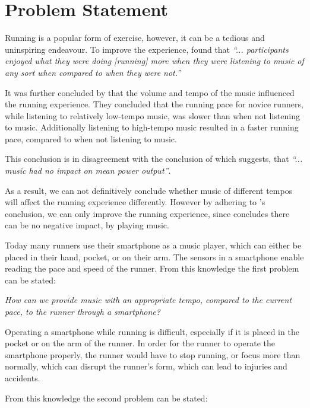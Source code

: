 \section{Problem Statement}
Running is a popular form of exercise, however, it can be a tedious and uninspiring endeavour.
To improve the experience, \citet{musicRunEffectArticle} found that 
\textit{``... participants enjoyed what they were doing [running] more when they were listening to music of any sort when compared to when they were not.''}

It was further concluded by \citet{musicRunEffectArticle} that the volume and tempo of the music influenced the running experience.
They concluded that the running pace for novice runners, while listening to relatively low-tempo music, was slower than when not listening to music. Additionally listening to high-tempo music resulted in a faster running pace, compared to when not listening to music.

This conclusion is in disagreement with the conclusion of \citet{musicNoPerformanceEffect} which suggests, that \textit{``... music had no impact on mean power output''}.

As a result, we can not definitively conclude whether music of different tempos will affect the running experience differently. 
However by adhering to \citet{musicRunEffectArticle}'s conclusion, we can only improve the running experience, since \citet{musicNoPerformanceEffect} concludes there can be no negative impact, by playing music.

Today many runners use their smartphone as a music player, which can either be placed in their hand, pocket, or on their arm.
The sensors in a smartphone enable reading the pace and speed of the runner.
From this knowledge the first problem can be stated:

\begin{center}
\textit{How can we provide music with an appropriate tempo, compared to the current pace, to the runner through a smartphone?}
\end{center}

Operating a smartphone while running is difficult, especially if it is placed in the pocket or on the arm of the runner.
In order for the runner to operate the smartphone properly, the runner would have to stop running, or focus more than normally, which can disrupt the runner's form, which can lead to injuries and accidents.

From this knowledge the second problem can be stated: 

